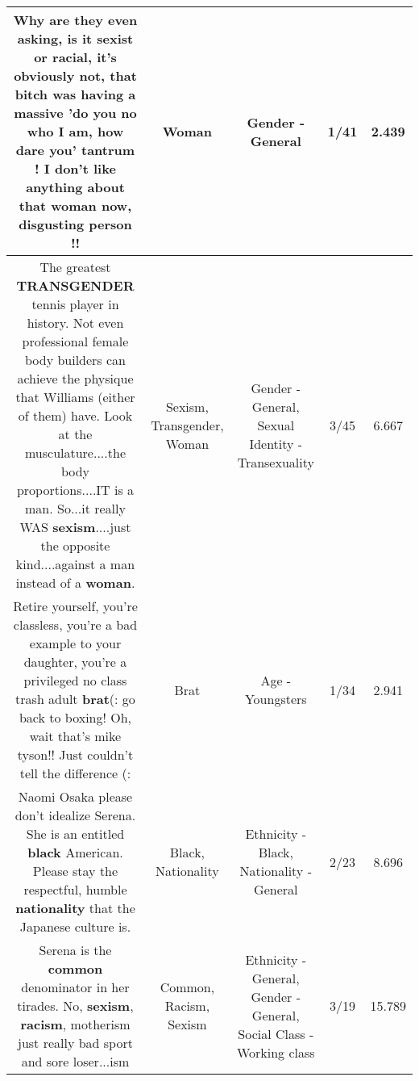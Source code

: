 \documentclass[11pt]{article}
\newlength\mylength
\begin{document}
\begin{center}
\begin{longtable}{|C{.65\mylength}|C{.30\mylength}|C{.12\mylength}|C{.12\mylength}|C{.12\mylength}|}
  \small Why are they even asking, is it sexist or racial, it's obviously not, that bitch was having a massive 'do you no who I am, how dare you' tantrum ! I don't like anything about that \textbf{woman} now, disgusting person !!\normalsize   & Woman & Gender - General & 1/41 & 2.439 \\  \hline
  \small The greatest \textbf{TRANSGENDER} tennis player in history.  Not even professional female body builders can achieve the physique that Williams (either of them) have.  Look at the musculature....the body proportions....IT is a man. So...it really WAS \textbf{sexism}....just the opposite  kind....against a man instead of a \textbf{woman}.\normalsize   & Sexism, Transgender, Woman & Gender - General, Sexual Identity - Transexuality & 3/45 & 6.667 \\  \hline
  \small Retire yourself, you're classless, you're a bad example to your daughter, you're a privileged no class trash adult \textbf{brat}(: go back to boxing! Oh, wait that's mike tyson!! Just couldn't tell the difference (:\normalsize   & Brat & Age - Youngsters & 1/34 & 2.941 \\  \hline
  \small Naomi Osaka please don't idealize Serena. She is an entitled \textbf{black} American. Please stay the respectful, humble \textbf{nationality} that the Japanese culture is.\normalsize   & Black, Nationality & Ethnicity - Black, Nationality - General & 2/23 & 8.696 \\  \hline
  \small Serena is the \textbf{common} denominator in her tirades. No, \textbf{sexism}, \textbf{racism}, motherism just really bad sport and sore loser...ism\normalsize   & Common, Racism, Sexism & Ethnicity - General, Gender - General, Social Class - Working class & 3/19 & 15.789 \\  \hline

\end{longtable}
\end{center}
\end{document}
